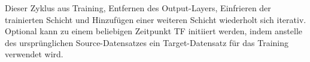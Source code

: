 Dieser Zyklus aus Training, Entfernen des Output-Layers, Einfrieren der trainierten Schicht und Hinzufügen einer weiteren Schicht wiederholt sich 
iterativ. Optional kann zu einem beliebigen Zeitpunkt TF initiiert werden, indem
anstelle des ursprünglichen Source-Datensatzes ein Target-Datensatz für das Training verwendet wird.
